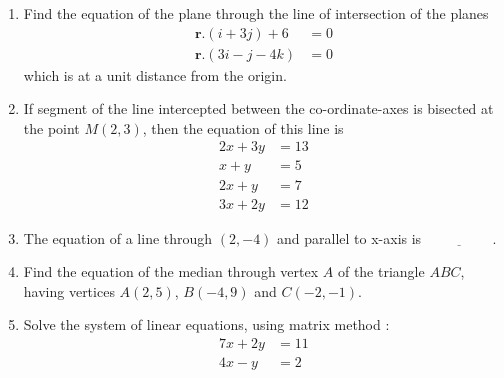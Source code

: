 \documentclass{article}
\let\vec\mathbf{}
\providecommand{\brak}[1]{\ensuremath{\left(#1\right)}}
\let\vec\mathbf
\begin{document}
\begin{enumerate}
\item  Find the equation of the plane through the line of intersection of the planes \\
\begin{align}
     \vec{r} .\brak{i+3j} + 6 &= 0 \\  \vec{r} .\brak{3i - j - 4k} &= 0
\end{align}
which is at a unit distance from the origin.\\
    \item If segment of the line intercepted between the co-ordinate-axes is bisected
at the point $M\brak{2, 3}$, then the equation of this line is
 \begin{align}
       2x + 3y &= 13\\
       x + y &= 5 \\
       2x + y &= 7\\
       3x + 2y &= 12
\end{align}
\item The equation of a line through $(2,-4)$ and parallel to x-axis is $\underline{\hspace{2cm}}$.
\item Find the equation of the median through vertex $A$ of the triangle $ABC$, having vertices $A\brak{2,5}$, $B\brak{-4,9}$ and $C\brak{-2, -1}$.
\item Solve the system of linear equations, using matrix method : 
\begin{align}
  7x + 2y &= 11\\
 4x - y &= 2
\end{align}
\end{enumerate}
\end{document}
